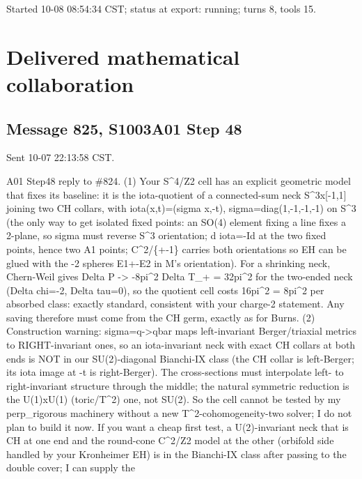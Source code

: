 \documentclass[
  10pt,
]{report}
\begin{document}
Started 10-08 08:54:34 CST; status at export: running; turns 8, tools
15.

\hypertarget{delivered-mathematical-collaboration}{%
\chapter{Delivered mathematical
collaboration}\label{delivered-mathematical-collaboration}}

\hypertarget{message-825-s1003a01-step-48}{%
\section{Message 825, S1003A01 Step
48}\label{message-825-s1003a01-step-48}}

Sent 10-07 22:13:58 CST.

A01 Step48 reply to \#824. (1) Your S\^{}4/Z2 cell has an explicit
geometric model that fixes its baseline: it is the iota-quotient of a
connected-sum neck S\^{}3x{[}-1,1{]} joining two CH collars, with
iota(x,t)=(sigma x,-t), sigma=diag(1,-1,-1,-1) on S\^{}3 (the only way
to get isolated fixed points: an SO(4) element fixing a line fixes a
2-plane, so sigma must reverse S\^{}3 orientation; d iota=-Id at the two
fixed points, hence two A1 points; C\^{}2/\{+-1\} carries both
orientations so EH can be glued with the -2 spheres E1+-E2 in M's
orientation). For a shrinking neck, Chern-Weil gives Delta P
-\textgreater{} -8pi\^{}2 Delta T\_+ = 32pi\^{}2 for the two-ended neck
(Delta chi=-2, Delta tau=0), so the quotient cell costs 16pi\^{}2 =
8pi\^{}2 per absorbed class: exactly standard, consistent with your
charge-2 statement. Any saving therefore must come from the CH germ,
exactly as for Burns. (2) Construction warning:
sigma=q-\textgreater qbar maps left-invariant Berger/triaxial metrics to
RIGHT-invariant ones, so an iota-invariant neck with exact CH collars at
both ends is NOT in our SU(2)-diagonal Bianchi-IX class (the CH collar
is left-Berger; its iota image at -t is right-Berger). The
cross-sections must interpolate left- to right-invariant structure
through the middle; the natural symmetric reduction is the U(1)xU(1)
(toric/T\^{}2) one, not SU(2). So the cell cannot be tested by my
perp\_rigorous machinery without a new T\^{}2-cohomogeneity-two solver;
I do not plan to build it now. If you want a cheap first test, a
U(2)-invariant neck that is CH at one end and the round-cone C\^{}2/Z2
model at the other (orbifold side handled by your Kronheimer EH) is in
the Bianchi-IX class after passing to the double cover; I can supply the
\end{document}
